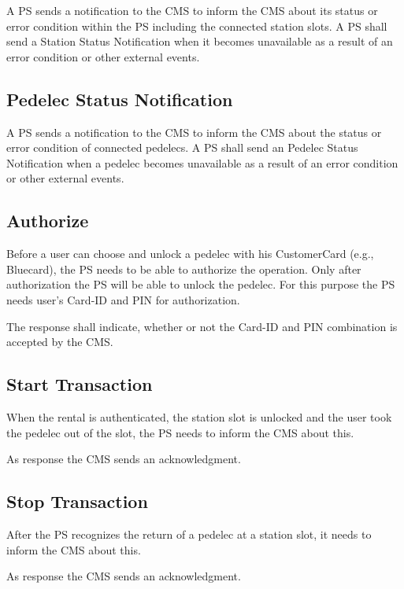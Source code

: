 A \acs{PS} sends a notification to the \acs{CMS} to inform the \acs{CMS} about its status or error condition within the \acs{PS} including the connected station slots. A \acs{PS} shall send a Station Status Notification when it becomes unavailable as a result of an error condition or other external events.

\subsection{Pedelec Status Notification}

A \acs{PS} sends a notification to the \acs{CMS} to inform the \acs{CMS} about the status or error condition of connected pedelecs. A \acs{PS} shall send an Pedelec Status Notification when a pedelec becomes unavailable as a result of an error condition or other external events.

\subsection{Authorize}

Before a user can choose and unlock a pedelec with his CustomerCard (e.g., Bluecard), the \acs{PS} needs to be able to authorize the operation. Only after authorization the \acs{PS} will be able to unlock the pedelec. For this purpose the \acs{PS} needs user's Card-ID and PIN for authorization.

The response shall indicate, whether or not the Card-ID and PIN combination is accepted by the \acs{CMS}.

\subsection{Start Transaction}

When the rental is authenticated, the station slot is unlocked and the user took the pedelec out of the slot, the \acs{PS} needs to inform the \acs{CMS} about this.

As response the \acs{CMS} sends an acknowledgment.

\subsection{Stop Transaction}

After the \acs{PS} recognizes the return of a pedelec at a station slot, it needs to inform the \acs{CMS} about this.

As response the \acs{CMS} sends an acknowledgment.


